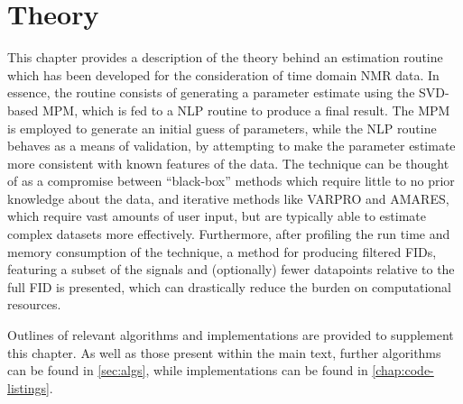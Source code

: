 \chapter{Theory}
\label{chap:theory}

This chapter provides a description of the theory behind an estimation
routine which has been developed for the consideration of time domain \ac{NMR}
data.
In essence, the routine consists of generating a parameter estimate using the
\ac{SVD}-based \ac{MPM}, which is fed to a \ac{NLP} routine to
produce a final result. The \ac{MPM} is employed to generate an initial
guess of parameters, while the \ac{NLP} routine behaves as a means of validation,
by attempting to make the parameter estimate more consistent with
known features of the data. The technique can be thought of as a compromise
between ``black-box'' methods\cite{Poullet2008} which require little to no
prior knowledge about the data, and iterative methods like \ac{VARPRO} and
\ac{AMARES}, which require vast amounts of user input, but are typically
able to estimate complex datasets more effectively.
Furthermore, after profiling the run time and memory consumption of the
technique, a method for producing filtered \acp{FID}, featuring a subset of the
signals and (optionally) fewer datapoints relative to the full \ac{FID} is
presented, which can drastically reduce the burden on computational resources.

Outlines of relevant algorithms and \Python implementations are
provided to supplement this chapter. As well as those present
within the main text, further algorithms can be found in \cref{sec:algs}, while
\Python implementations can be found in \cref{chap:code-listings}.







